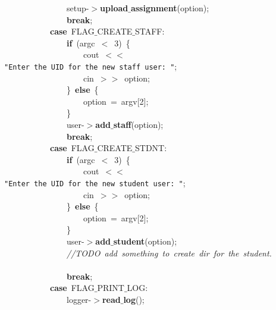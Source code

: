 \mbox{}\ \ \ \ \ \ \ \ \ \ \ \ \ \ \ \ setup-$>$\textbf{upload$\_$assignment}(option); \\
\mbox{}\ \ \ \ \ \ \ \ \ \ \ \ \ \ \ \ \textbf{break}; \\
\mbox{}\ \ \ \ \ \ \ \ \ \ \ \ \textbf{case}\ FLAG$\_$CREATE$\_$STAFF: \\
\mbox{}\ \ \ \ \ \ \ \ \ \ \ \ \ \ \ \ \textbf{if}\ (argc\ $<$\ 3)\ \{ \\
\mbox{}\ \ \ \ \ \ \ \ \ \ \ \ \ \ \ \ \ \ \ \ cout\ $<$$<$\ \texttt{"{}Enter\ the\ UID\ for\ the\ new\ staff\ user:\ "{}}; \\
\mbox{}\ \ \ \ \ \ \ \ \ \ \ \ \ \ \ \ \ \ \ \ cin\ $>$$>$\ option; \\
\mbox{}\ \ \ \ \ \ \ \ \ \ \ \ \ \ \ \ \}\ \textbf{else}\ \{ \\
\mbox{}\ \ \ \ \ \ \ \ \ \ \ \ \ \ \ \ \ \ \ \ option\ =\ argv[2]; \\
\mbox{}\ \ \ \ \ \ \ \ \ \ \ \ \ \ \ \ \} \\
\mbox{}\ \ \ \ \ \ \ \ \ \ \ \ \ \ \ \ user-$>$\textbf{add$\_$staff}(option); \\
\mbox{}\ \ \ \ \ \ \ \ \ \ \ \ \ \ \ \ \textbf{break}; \\
\mbox{}\ \ \ \ \ \ \ \ \ \ \ \ \textbf{case}\ FLAG$\_$CREATE$\_$STDNT: \\
\mbox{}\ \ \ \ \ \ \ \ \ \ \ \ \ \ \ \ \textbf{if}\ (argc\ $<$\ 3)\ \{ \\
\mbox{}\ \ \ \ \ \ \ \ \ \ \ \ \ \ \ \ \ \ \ \ cout\ $<$$<$\ \texttt{"{}Enter\ the\ UID\ for\ the\ new\ student\ user:\ "{}}; \\
\mbox{}\ \ \ \ \ \ \ \ \ \ \ \ \ \ \ \ \ \ \ \ cin\ $>$$>$\ option; \\
\mbox{}\ \ \ \ \ \ \ \ \ \ \ \ \ \ \ \ \}\ \textbf{else}\ \{ \\
\mbox{}\ \ \ \ \ \ \ \ \ \ \ \ \ \ \ \ \ \ \ \ option\ =\ argv[2]; \\
\mbox{}\ \ \ \ \ \ \ \ \ \ \ \ \ \ \ \ \} \\
\mbox{}\ \ \ \ \ \ \ \ \ \ \ \ \ \ \ \ user-$>$\textbf{add$\_$student}(option); \\
\mbox{}\ \ \ \ \ \ \ \ \ \ \ \ \ \ \ \ \textit{//TODO\ add\ something\ to\ create\ dir\ for\ the\ student.} \\
\mbox{} \\
\mbox{}\ \ \ \ \ \ \ \ \ \ \ \ \ \ \ \ \textbf{break}; \\
\mbox{}\ \ \ \ \ \ \ \ \ \ \ \ \textbf{case}\ FLAG$\_$PRINT$\_$LOG: \\
\mbox{}\ \ \ \ \ \ \ \ \ \ \ \ \ \ \ \ logger-$>$\textbf{read$\_$log}(); \\
